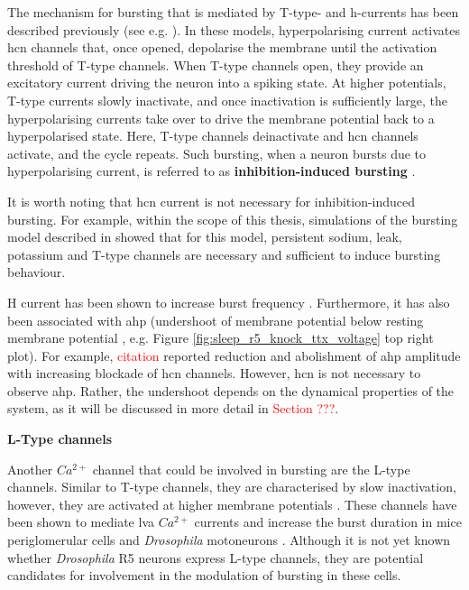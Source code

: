 \documentclass[../main.tex]{subfiles}
\begin{document}
The mechanism for bursting that is mediated by T-type- and h-currents has been described previously (see e.g. \cite{liuMultipleConductancesCooperatively2008}). In these models, hyperpolarising current activates \gls{hcn} channels that, once opened, depolarise the membrane until the activation threshold of T-type channels. When T-type channels open, they provide an excitatory current driving the neuron into a spiking state.
At higher potentials, T-type currents slowly inactivate, and once inactivation is sufficiently large, the hyperpolarising currents take over to drive the membrane potential back to a hyperpolarised state.
Here, T-type channels deinactivate and \gls{hcn} channels activate, and the cycle repeats. Such bursting, when a neuron bursts due to hyperpolarising current, is referred to as \textbf{inhibition-induced bursting} \cite{izhikevichDynamicalSystemsNeuroscience2006}.

It is worth noting that \gls{hcn} current is not necessary for inhibition-induced bursting. For example, within the scope of this thesis, simulations of the bursting model described in \cite{wangMultipleDynamicalModes1994}
showed that for this model, persistent sodium, leak, potassium and T-type channels are necessary and sufficient to induce bursting behaviour.

H current has been shown to increase burst frequency \cite{liuMultipleConductancesCooperatively2008,mccormickModelElectrophysiologicalProperties1992}.
Furthermore, it has also been associated with \gls{ahp} (undershoot of membrane potential below resting membrane potential \cite{mccormickModelElectrophysiologicalProperties1992}, e.g. Figure \ref{fig:sleep_r5_knock_ttx_voltage} top right plot). For example, \textcolor{red}{citation} reported reduction and abolishment of \gls{ahp} amplitude with increasing blockade of \gls{hcn} channels. However, \gls{hcn} is not necessary to observe \gls{ahp}. Rather, the undershoot depends on the dynamical properties of the system, as it will be discussed in more detail in \textcolor{red}{Section ???}.

\noindent\textbf{L-Type channels}

Another $Ca^{2+}$ channel that could be involved in bursting are the L-type channels. Similar to T-type channels, they are characterised by slow inactivation, however, they are activated at higher membrane potentials \cite{liuMultipleConductancesCooperatively2008}.
These channels have been shown to mediate \gls{lva} $Ca^{2+}$ currents and increase the burst duration in mice periglomerular cells \cite{liuMultipleConductancesCooperatively2008} and \textit{Drosophila} motoneurons \cite{kadasDendriticAxonalLType2017}.
Although it is not yet known whether \textit{Drosophila} R5 neurons express L-type channels, they are potential candidates for involvement in the modulation of bursting in these cells.
\end{document}
